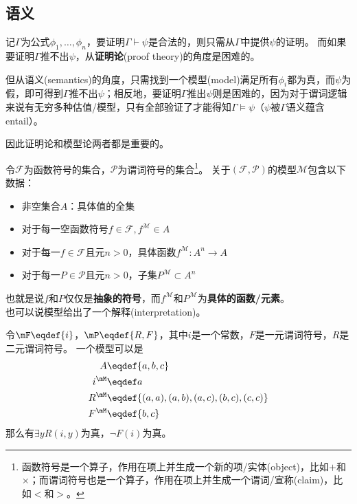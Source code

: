 \subsection{语义}
记$\Gamma$为公式$\phi_1,\ldots,\phi_n$，要证明$\Gamma\vdash\psi$是合法的，则只需从$\Gamma$中提供$\psi$的证明。
而如果要证明$\Gamma$推不出$\psi$，从\textbf{证明论}(proof theory)的角度是困难的。

但从语义(semantics)的角度，只需找到一个模型(model)满足所有$\phi_i$都为真，而$\psi$为假，即可得到$\Gamma$推不出$\psi$；相反地，要证明$\Gamma$推出$\psi$则是困难的，因为对于谓词逻辑来说有无穷多种估值/模型，只有全部验证了才能得知$\Gamma\models\psi$（$\psi$被$\Gamma$语义蕴含entail）。

因此证明论和模型论两者都是重要的。

\begin{definition}[模型(model)]
令$\mathcal{F}$为函数符号的集合，$\mathcal{P}$为谓词符号的集合\footnote{函数符号是一个算子，作用在项上并生成一个新的项/实体(object)，比如$+$和$\times$；而谓词符号也是一个算子，作用在项上并生成一个谓词/宣称(claim)，比如$<$和$>$。}。
关于$(\mathcal{F},\mathcal{P})$的模型$\mathcal{M}$包含以下数据：
\begin{itemize}
	\item 非空集合$A$：具体值的全集
	\item 对于每一空函数符号$f\in\mathcal{F},f^{\mathcal{M}}\in A$
	\item 对于每一$f\in\mathcal{F}$且元$n>0$，具体函数$f^{\mathcal{M}}:A^n\to A$
	\item 对于每一$P\in\mathcal{P}$且元$n>0$，子集$P^\mathcal{M}\subset A^n$
\end{itemize}
也就是说$f$和$P$仅仅是\textbf{抽象的符号}，而$f^{\mathcal{M}}$和$P^{\mathcal{M}}$为\textbf{具体的函数/元素}。\\
也可以说模型给出了一个解释(interpretation)。
\end{definition}
\begin{example}
令$\mF\eqdef\{i\}$，$\mP\eqdef\{R,F\}$，其中$i$是一个常数，$F$是一元谓词符号，$R$是二元谓词符号。
一个模型可以是
\[\begin{aligned}
A &\eqdef\{a,b,c\}\\
i^{\mM} &\eqdef a\\
R^{\mM} &\eqdef\{(a,a),(a,b),(a,c),(b,c),(c,c)\}\\
F^{\mM} &\eqdef\{b,c\}
\end{aligned}\]
那么有$\exists yR(i,y)$为真，$\lnot F(i)$为真。
\end{example}

